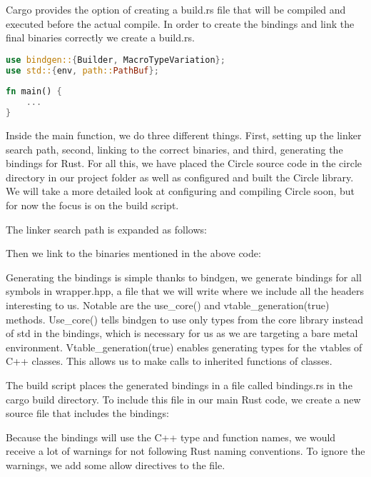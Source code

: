 Cargo provides the option of creating a build.rs file that will be compiled and executed before the actual compile.
In order to create the bindings and link the final binaries correctly we create a build.rs.
\begin{lstlisting}[language=Rust,style=colouredRust]
use bindgen::{Builder, MacroTypeVariation};
use std::{env, path::PathBuf};
    
fn main() {
    ...
}    
\end{lstlisting}

Inside the main function, we do three different things.
First, setting up the linker search path, second, linking to the correct binaries, and third, generating the bindings for Rust.
For all this, we have placed the Circle source code in the circle directory in our project folder as well as configured and built the Circle library.
We will take a more detailed look at configuring and compiling Circle soon, but for now the focus is on the build script.

The linker search path is expanded as follows:


Then we link to the binaries mentioned in the above code:


Generating the bindings is simple thanks to bindgen, we generate bindings for all symbols in wrapper.hpp,
a file that we will write where we include all the headers interesting to us.
Notable are the use\_core() and vtable\_generation(true) methods.
Use\_core() tells bindgen to use only types from the core library instead of std in the bindings, which is necessary for us as we are targeting a bare metal environment.
Vtable\_generation(true) enables generating types for the vtables of C++ classes.
This allows us to make calls to inherited functions of classes.


The build script places the generated bindings in a file called bindings.rs in the cargo build directory.
To include this file in our main Rust code, we create a new source file that includes the bindings:


Because the bindings will use the C++ type and function names, we would receive a lot of warnings for not following Rust naming conventions.
To ignore the warnings, we add some allow directives to the file.

